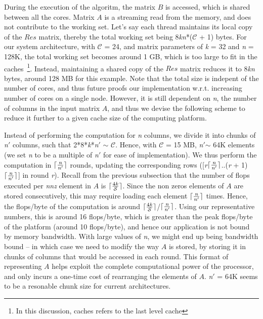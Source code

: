      During the execution of the algoritm, the matrix $B$ is
     accessed, which is shared between all the cores. Matrix $A$ is a
     streaming read from the memory, and does not contribute to
     the working set. Let's say each thread maintains  its local copy
     of the $Res$ matrix, thereby the total working set being
     8{\it{kn}}*($\mathcal{C}$ + 1) bytes. For our system
     architecture, with $\mathcal{C}$ = 24, and matrix parameters of
     {\it{k}} = 32 and {\it{n}} = 128K, the total working set becomes
     around 1 GB, which is too large to fit in the
     caches~\footnote{In this discussion, caches refers to the last
     level cache}. Instead,
     maintaining a shared copy of the $Res$ matrix reduces it to
     8{\it{kn}} bytes, around 128 MB for this example. Note that the
     total size is indepent of the number of cores, and thus future
     proofs our implementation w.r.t. increasing number of cores on a
     single node. However, it is still dependent on {\it{n}}, the
     number of columns in the input matrix $A$, and thus we devise the
     following scheme to reduce it further to a given cache size of
     the computing platform.

     Instead of performing the computation for {\it{n}} columns, we
     divide it into chunks of {\it{n}}$'$ columns, such that
     2*8*{\it{k}}*{\it{n}}$'$ $\sim$ $\mathcal{C}$. Hence, with
     $\mathcal{C}$ = 15 MB,  {\it{n}}$'$$\sim$ 64K elements (we set
     {\it{n}} to be a multiple of {\it{n}}$'$ for ease of
     implementation). We thus perform the computation in
     $\lceil\frac{\it{n}}{\it{n}'}\rceil$ rounds, 
     updating the corresponding rows
     ([{\it{r}}$\lceil\frac{\it{n}}{\it{n}'}\rceil$..({\it{r}} +
     1)$\lceil\frac{\it{n}}{\it{n}'}\rceil$]
     in round {\it{r}}).
     Recall from the previous subsection that the number of flops
     executed per {\it{nnz}} element in $A$ is
     $\lceil\frac{4{\it{k}}}{\mathcal{S}}\rceil$.
     Since the non zeros elements of $A$ are stored consecutively, 
     this may require loading each element
     $\lceil\frac{\it{n}}{\it{n}'}\rceil$ times. Hence, the flops/byte
     of the computation is around
     $\lceil\frac{4{\it{k}}}{\mathcal{S}}\rceil$/$\lceil\frac{\it{n}}{\it{n}'}\rceil$.
     Using our representative numbers, this is around 16 flops/byte,
     which is greater than the peak flops/byte of the platform (around
     10 flops/byte), and
     hence our application is not bound by memory bandwidth. With
     large values of {\it{n}}, we might end up being bandwidth bound
     -- in which case we need to modify the way $A$ is stored, by
     storing it in chunks of columns that would be accessed in each
     round. This format of representing $A$  helps 
     exploit the complete computational power of the processor, 
     and only incurs a
     one-time cost of rearranging  the elements of $A$.
     {\it{n}}$'$ = 64K seems to be a resonable chunk size for current
     architectures.

